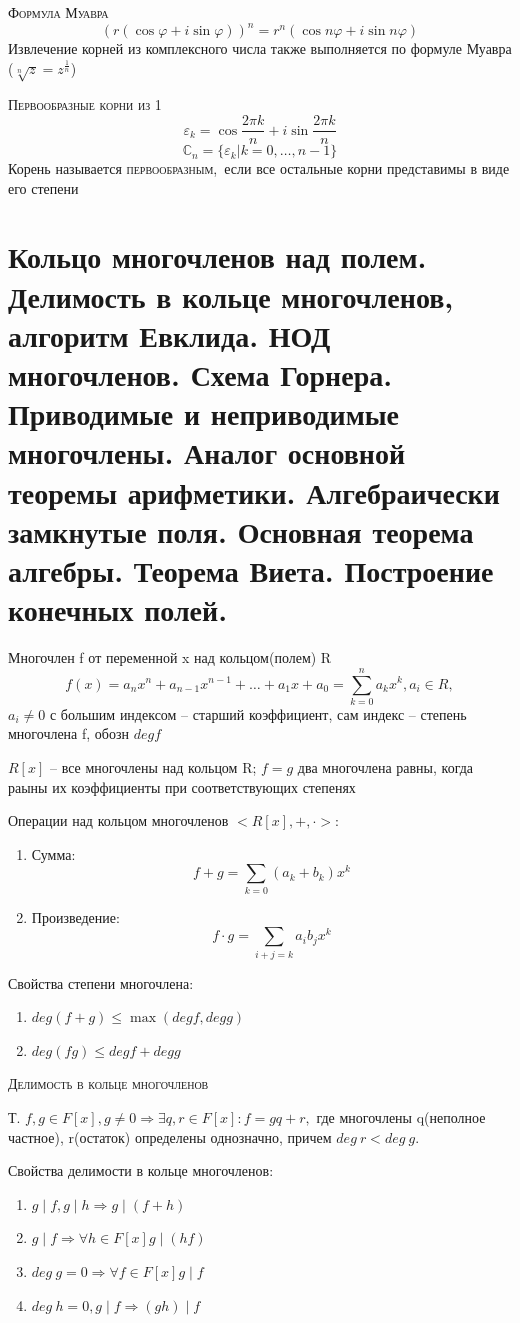 \documentclass{article}
\begin{document}
\textsc{Формула Муавра}
$$(r(\cos\varphi+i\sin\varphi))^n=r^n(\cos n\varphi+i\sin n\varphi)$$
Извлечение корней из комплексного числа также выполняется по формуле Муавра ($\sqrt[n]{z}=z^{\frac{1}{n}}$)

\textsc{Первообразные корни из 1}
$$\varepsilon_k=\cos\frac{2\pi k}{n}+i\sin\frac{2\pi k}{n}$$
$$\mathbb{C}_n=\{\varepsilon_k|k=0,\dots,n-1\}$$
Корень называется \textsc{первообразным}, если все остальные корни представимы в виде его степени

\section{Кольцо многочленов над полем. Делимость в кольце многочленов, алгоритм Евклида. НОД многочленов. Схема Горнера. Приводимые и неприводимые многочлены. Аналог основной теоремы арифметики. Алгебраически замкнутые поля. Основная теорема алгебры. Теорема Виета. Построение конечных полей.}
Многочлен f от переменной x над кольцом(полем) R
$$f(x)=a_nx^n+a_{n-1}x^{n-1}+\dots+a_1x+a_0=\sum^n_{k=0}a_kx^k, a_i\in R,$$
$a_i\neq 0$ с большим индексом – старший коэффициент, сам индекс – степень многочлена f, обозн $deg f$

$R[x]$ – все многочлены над кольцом R; $f=g$ два многочлена равны, когда раыны их коэффициенты при соответствующих степенях

Операции над кольцом многочленов $<R[x], +, \cdot>$:
\begin{enumerate}
    \item Сумма: $$f+g=\sum_{k=0}(a_k+b_k)x^k$$
    \item Произведение: $$f\cdot g=\sum_{i+j=k}a_ib_jx^k$$
\end{enumerate}

Свойства степени многочлена:
\begin{enumerate}
    \item $deg (f+g)\leq \max(deg f, deg g)$
    \item $deg (fg)\leq deg f+deg g$
\end{enumerate}

\textsc{Делимость в кольце многочленов}

Т. $f, g\in F[x], g\neq 0\Rightarrow\exists q, r\in F[x]\colon f=gq+r,$ где многочлены q(неполное частное), r(остаток) определены однозначно, причем $deg\ r<deg\ g$.

Свойства делимости в кольце многочленов:
\begin{enumerate}
    \item $g\mid f, g\mid h \Rightarrow g\mid (f+h)$
    \item $g\mid f\Rightarrow \forall h\in F[x] g\mid (hf)$
    \item $deg\ g=0\Rightarrow \forall f\in F[x] g\mid f$
    \item $deg\ h=0, g\mid f\Rightarrow (gh)\mid f$
\end{enumerate}
\end{document}
